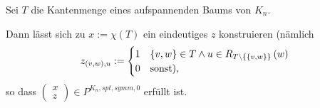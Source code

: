 \documentclass[10p,a4paper,BCOR = 12mm, DIV=15]{scrbook}
\begin{document}
\begin{Sa}
\label{sa:einbettung_normale_erweiterung}
Sei $T$ die Kantenmenge eines aufspannenden Baums von $K_n$.

Dann lässt sich zu $x:=\chi\left(T\right)$ ein eindeutiges $z$ konstruieren (nämlich 
\begin{equation}
z_{\left(v, w\right), u} := \begin{cases}
1 & \left\{v, w\right\}\in T\wedge u\in R_{T\backslash \left\{\left\{v, w\right\}\right\}}\left(w\right)\\
0 & \textnormal{sonst),}
\end{cases} \label{eq:z_belegung}
\end{equation}
so dass $
\left(
\begin{array}{c}
x \\
z
\end{array}
\right)
\in P^{K_n, spt, symm, 0}$ erfüllt ist.
\end{Sa}
\end{document}
